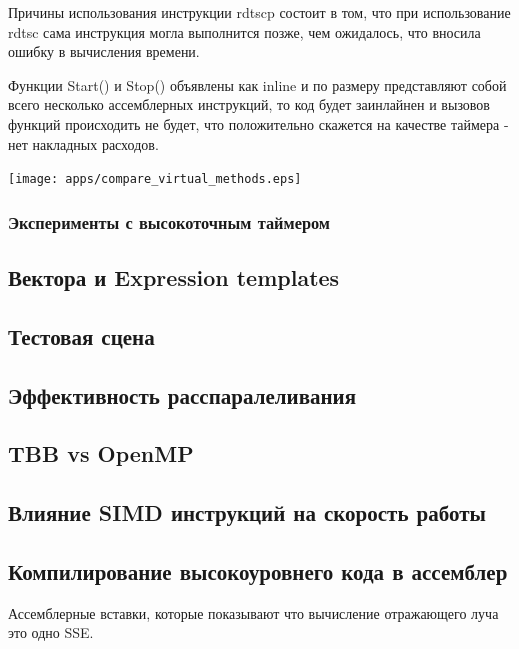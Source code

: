 \documentclass[12pt, a4paper]{article}
\begin{document}
Причины использования инструкции rdtscp состоит в том, что при использование rdtsc сама инструкция могла выполнится позже, чем ожидалось, что вносила ошибку в вычисления времени.

Функции Start() и Stop() объявлены как inline и по размеру представляют собой всего несколько ассемблерных инструкций, то код будет заинлайнен и вызовов функций происходить не будет, что положительно скажется на качестве таймера - нет накладных расходов.

{\hspace*{-2.25cm}\texttt{[image: apps/compare\_virtual\_methods.eps]} }

\subsubsection{Эксперименты с высокоточным таймером}

\subsection{Вектора и Expression templates}

\subsection{Тестовая сцена}

\subsection{Эффективность расспаралеливания}

\subsection{TBB vs OpenMP}

\subsection{Влияние SIMD инструкций на скорость работы}

\subsection{Компилирование высокоуровнего кода в ассемблер}

Ассемблерные вставки, которые показывают что вычисление отражающего луча это одно SSE.

\end{document}

